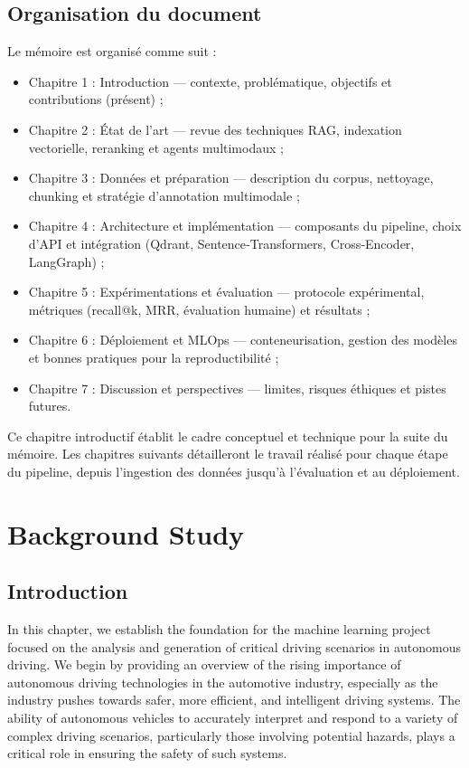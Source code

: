 \documentclass[12pt,a4paper]{report}
\begin{document}
\section{Organisation du document}
Le mémoire est organisé comme suit :
\begin{itemize}
  \item Chapitre 1 : Introduction — contexte, problématique, objectifs et contributions (présent) ;
  \item Chapitre 2 : État de l'art — revue des techniques RAG, indexation vectorielle, reranking et agents multimodaux ;
  \item Chapitre 3 : Données et préparation — description du corpus, nettoyage, chunking et stratégie d'annotation multimodale ;
  \item Chapitre 4 : Architecture et implémentation — composants du pipeline, choix d'API et intégration (Qdrant, Sentence‑Transformers, Cross‑Encoder, LangGraph) ;
  \item Chapitre 5 : Expérimentations et évaluation — protocole expérimental, métriques (recall@k, MRR, évaluation humaine) et résultats ;
  \item Chapitre 6 : Déploiement et MLOps — conteneurisation, gestion des modèles et bonnes pratiques pour la reproductibilité ;
  \item Chapitre 7 : Discussion et perspectives — limites, risques éthiques et pistes futures.
\end{itemize}

Ce chapitre introductif établit le cadre conceptuel et technique pour la suite du mémoire. Les chapitres suivants détailleront le travail réalisé pour chaque étape du pipeline, depuis l'ingestion des données jusqu'à l'évaluation et au déploiement.

\chapter{Background Study}
\clearpage

\section*{Introduction}

In this chapter, we establish the foundation for the machine learning project focused on the analysis and generation of critical driving scenarios in autonomous driving. We begin by providing an overview of the rising importance of autonomous driving technologies in the automotive industry, especially as the industry pushes towards safer, more efficient, and intelligent driving systems. The ability of autonomous vehicles to accurately interpret and respond to a variety of complex driving scenarios, particularly those involving potential hazards, plays a critical role in ensuring the safety of such systems.
\end{document}
